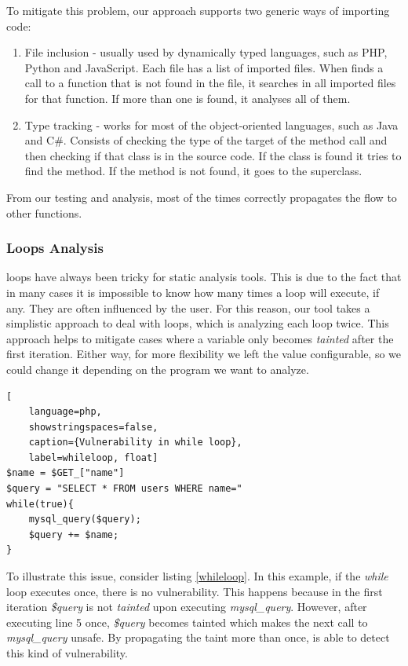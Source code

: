 To mitigate this problem, our approach supports two generic ways of importing code:
\begin{enumerate}
    \item File inclusion - usually used by dynamically typed languages, such as PHP, Python and JavaScript. Each file has a list of imported files. When \toolname{} finds a call to a function that is not found in the file, it searches in all imported files for that function. If more than one is found, it analyses all of them.
    
    \item Type tracking - works for most of the object-oriented languages, such as Java and C\#. Consists of checking the type of the target of the method call and then checking if that class is in the source code. If the class is found it tries to find the method. If the method is not found, it goes to the superclass.
\end{enumerate}

From our testing and analysis, most of the times \toolname{} correctly propagates the flow to other functions.


\subsubsection{Loops Analysis} loops have always been tricky for static analysis tools. This is due to the fact that in many cases it is impossible to know how many times a loop will execute, if any. They are often influenced by the user. For this reason, our tool takes a simplistic approach to deal with loops, which is analyzing each loop twice. This approach helps to mitigate cases where a variable only becomes \textit{tainted} after the first iteration. Either way, for more flexibility we left the value configurable, so we could change it depending on the program we want to analyze. 

\begin{lstlisting}[
    language=php,
    showstringspaces=false,
    caption={Vulnerability in while loop},
    label=whileloop, float] 
$name = $GET_["name"]    
$query = "SELECT * FROM users WHERE name=" 
while(true){
    mysql_query($query);
    $query += $name;
}
\end{lstlisting}

To illustrate this issue, consider listing \ref{whileloop}. In this example, if the \textit{while} loop executes once, there is no vulnerability. This happens because in the first iteration \textit{\$query} is not \textit{tainted} upon executing \textit{mysql\_query}. However, after executing line 5 once, \textit{\$query} becomes tainted which makes the next call to \textit{mysql\_query} unsafe. By propagating the taint more than once, \toolname{} is able to detect this kind of vulnerability.





